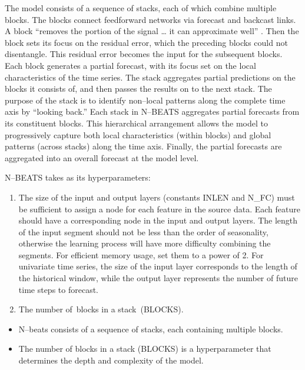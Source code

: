 \documentclass[12pt,a4paper]{report}
\numberwithin{equation}{section}
\begin{document}
The model consists of a sequence of stacks, each of which combine
multiple blocks. The blocks connect feedforward networks via forecast
and backcast links. A block ``removes the portion of the signal \ldots{}
it can approximate well'' \cite{oreshkin2019nbeats_51}. Then the block sets its focus on the
residual error, which the preceding blocks could not disentangle. This
residual error becomes the input for the subsequent blocks. Each block
generates a partial forecast, with its focus set on the local
characteristics of the time series. The stack aggregates partial
predictions on the blocks it consists of, and then passes the results on
to the next stack. The purpose of the stack is to identify non--local
patterns along the complete time axis by ``looking back.'' Each stack in
N--BEATS aggregates partial forecasts from its constituent blocks. This
hierarchical arrangement allows the model to progressively capture both
local characteristics (within blocks) and global patterns (across
stacks) along the time axis. Finally, the partial forecasts are
aggregated into an overall forecast at the model level.

N--BEATS takes as its hyperparameters:

\begin{enumerate}
\def\labelenumi{\roman{enumi}.}
\item
  The size of the input and output layers (constants INLEN and N\_FC)
  must be sufficient to assign a node for each feature in the source
  data. Each feature should have a corresponding node in the input and
  output layers. The length of the input segment should not be less than
  the order of seasonality, otherwise the learning process will have
  more difficulty combining the segments. For efficient memory usage,
  set them to a power of 2. For univariate time series, the size of the
  input layer corresponds to the length of the historical window, while
  the output layer represents the number of future time steps to
  forecast.
\item
  The number of~blocks in a stack~(BLOCKS).
\end{enumerate}

\begin{itemize}
\item
  N--beats consists of a sequence of stacks, each containing multiple
  blocks.
\item
  The number of blocks in a stack (BLOCKS) is a hyperparameter that
  determines the depth and complexity of the model.
\end{itemize}
\end{document}
